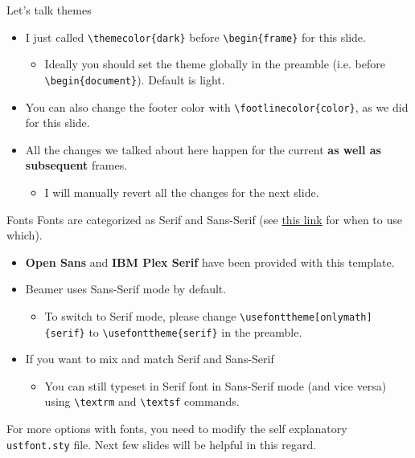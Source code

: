 \documentclass[]{beamer}
\newcommand{\hrefcol}[2]{\textcolor{uihteal}{\href{#1}{#2}}}
\begin{document}
\begin{frame}[fragile]{Let's talk themes}
\begin{itemize}
\item I just called \verb|\themecolor{dark}| before \verb|\begin{frame}| for this slide.
\begin{itemize}
    \item Ideally you should set the theme globally in the preamble (i.e. before \verb|\begin{document}|). Default is light.
\end{itemize}
\item You can also change the footer color with \verb|\footlinecolor{color}|, as we did for this slide.
\item All the changes we talked about here happen for the current \textbf{as well as subsequent} frames.
\begin{itemize}
    \item I will manually revert all the changes for the next slide.
\end{itemize}
\end{itemize}
\end{frame}




\begin{frame}[fragile]{Fonts}
Fonts are categorized as \textrm{Serif} and \textsf{Sans-Serif} (see \hrefcol{https://www.adobe.com/creativecloud/design/discover/serif-vs-sans-serif.html}{this link} for when to use which).

\begin{itemize}
    \item \textbf{\textsf{Open Sans}} and \textbf{\textrm{IBM Plex Serif}} have been provided with this template.
    \item Beamer uses \textsf{Sans-Serif} mode by default.
    \begin{itemize}
        \item To switch to Serif mode, please change \verb|\usefonttheme[onlymath]{serif}| to \verb|\usefonttheme{serif}| in the preamble.
    \end{itemize}
    \item If you want to mix and match Serif and Sans-Serif
    \begin{itemize}
        \item You can still typeset in Serif font in Sans-Serif mode (and vice versa) using \verb|\textrm| and \verb|\textsf| commands.
    \end{itemize}
\end{itemize}
For more options with fonts, you need to modify the self explanatory \verb|ustfont.sty| file. Next few slides will be helpful in this regard.
\end{frame}
\end{document}
